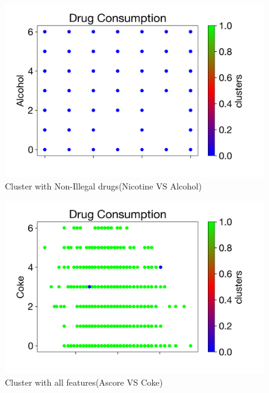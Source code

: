 \documentclass[10pt]{article}
\begin{document}
\begin{figure}[H]
\caption{Cluster with Non-Illegal drugs(Nicotine VS Alcohol) }
\label{fig:NicotineVsAlcohol}
\centering
\includegraphics[scale=0.35]{cluster2-NicotineVsAlcohol.png}
\end{figure}

\begin{figure}[H]
\caption{Cluster with all features(Ascore VS Coke) }
\label{fig:AscoreVsCoke}
\centering
\includegraphics[scale=0.35]{figures/cluster1-AscorevsCoke.png}
\end{figure}
\end{document}
